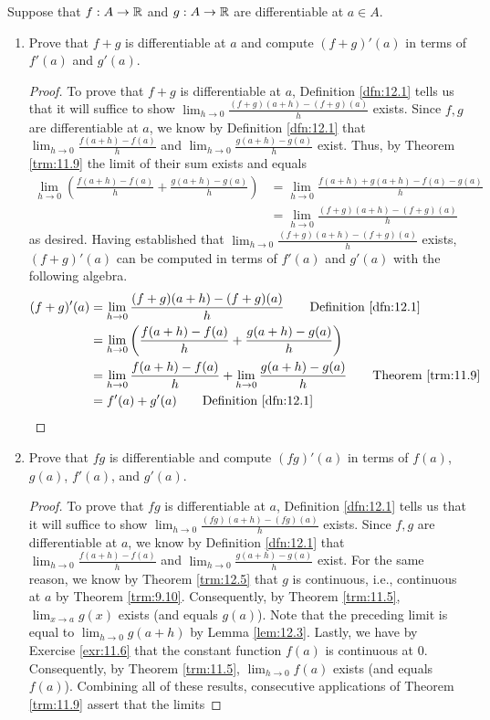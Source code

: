 \documentclass[../main.tex]{subfiles}
\begin{document}
\begin{exercise}\label{exr:12.9}
    Suppose that $f:A\to\mathbb{R}$ and $g:A\to\mathbb{R}$ are differentiable at $a\in A$.
    \begin{enumerate}[label={(\alph*)}]
        \item Prove that $f+g$ is differentiable at $a$ and compute $(f+g)'(a)$ in terms of $f'(a)$ and $g'(a)$.
        \begin{proof}
            To prove that $f+g$ is differentiable at $a$, Definition \ref{dfn:12.1} tells us that it will suffice to show $\lim_{h\to 0}\frac{(f+g)(a+h)-(f+g)(a)}{h}$ exists. Since $f,g$ are differentiable at $a$, we know by Definition \ref{dfn:12.1} that $\lim_{h\to 0}\frac{f(a+h)-f(a)}{h}$ and $\lim_{h\to 0}\frac{g(a+h)-g(a)}{h}$ exist. Thus, by Theorem \ref{trm:11.9} the limit of their sum exists and equals
            \begin{align*}
                \lim_{h\to 0}\left( \frac{f(a+h)-f(a)}{h}+\frac{g(a+h)-g(a)}{h} \right) &= \lim_{h\to 0}\frac{f(a+h)+g(a+h)-f(a)-g(a)}{h}\\
                &= \lim_{h\to 0}\frac{(f+g)(a+h)-(f+g)(a)}{h}
            \end{align*}
            as desired. Having established that $\lim_{h\to 0}\frac{(f+g)(a+h)-(f+g)(a)}{h}$ exists, $(f+g)'(a)$ can be computed in terms of $f'(a)$ and $g'(a)$ with the following algebra.
            \begin{align*}
                (f+g)'(a) &= \lim_{h\to 0}\frac{(f+g)(a+h)-(f+g)(a)}{h}\tag*{Definition \ref{dfn:12.1}}\\
                &= \lim_{h\to 0}\left( \frac{f(a+h)-f(a)}{h}+\frac{g(a+h)-g(a)}{h} \right)\\
                &= \lim_{h\to 0}\frac{f(a+h)-f(a)}{h}+\lim_{h\to 0}\frac{g(a+h)-g(a)}{h}\tag*{Theorem \ref{trm:11.9}}\\
                &= f'(a)+g'(a)\tag*{Definition \ref{dfn:12.1}}
            \end{align*}
        \end{proof}
        \item Prove that $fg$ is differentiable and compute $(fg)'(a)$ in terms of $f(a)$, $g(a)$, $f'(a)$, and $g'(a)$.
        \begin{proof}
            To prove that $fg$ is differentiable at $a$, Definition \ref{dfn:12.1} tells us that it will suffice to show $\lim_{h\to 0}\frac{(fg)(a+h)-(fg)(a)}{h}$ exists. Since $f,g$ are differentiable at $a$, we know by Definition \ref{dfn:12.1} that $\lim_{h\to 0}\frac{f(a+h)-f(a)}{h}$ and $\lim_{h\to 0}\frac{g(a+h)-g(a)}{h}$ exist. For the same reason, we know by Theorem \ref{trm:12.5} that $g$ is continuous, i.e., continuous at $a$ by Theorem \ref{trm:9.10}. Consequently, by Theorem \ref{trm:11.5}, $\lim_{x\to a}g(x)$ exists (and equals $g(a)$). Note that the preceding limit is equal to $\lim_{h\to 0}g(a+h)$ by Lemma \ref{lem:12.3}. Lastly, we have by Exercise \ref{exr:11.6} that the constant function $f(a)$ is continuous at 0. Consequently, by Theorem \ref{trm:11.5}, $\lim_{h\to 0}f(a)$ exists (and equals $f(a)$). Combining all of these results, consecutive applications of Theorem \ref{trm:11.9} assert that the limits

\end{proof}
\end{enumerate}
\end{exercise}
\end{document}
